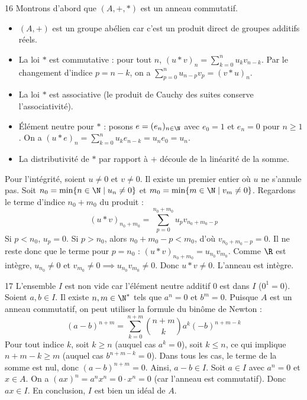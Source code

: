 \begin{correction}{16}
Montrons d'abord que $(A,+,*)$ est un anneau commutatif. 
\begin{itemize}
 \item $(A,+)$ est un groupe abélien car c'est un produit direct de groupes additifs réels. 
 \item La loi $*$ est commutative : pour tout $n$, $(u*v)_n = \sum_{k=0}^n u_k v_{n-k}$. Par le changement d'indice $p = n-k$, on a $\sum_{p=0}^n u_{n-p} v_p = (v*u)_n$. 
 \item La loi $*$ est associative (le produit de Cauchy des suites conserve l'associativité). 
 \item Élément neutre pour $*$ : posons $e = (e_n)_{n\in\N}$ avec $e_0=1$ et $e_n=0$ pour $n \ge 1$. On a $(u*e)_n = \sum_{k=0}^n u_k e_{n-k} = u_n e_0 = u_n$. 
 \item La distributivité de $*$ par rapport à $+$ découle de la linéarité de la somme. 
\end{itemize}
Pour l'intégrité, soient $u \neq 0$ et $v \neq 0$. Il existe un premier entier où $u$ ne s'annule pas. Soit $n_0 = \min \{n \in \N \mid u_n \neq 0\}$ et $m_0 = \min \{m \in \N \mid v_m \neq 0\}$. 
Regardons le terme d'indice $n_0+m_0$ du produit :
\[(u*v)_{n_0+m_0} = \sum_{p=0}^{n_0+m_0} u_p v_{n_0+m_0-p}\]
Si $p < n_0$, $u_p = 0$. Si $p > n_0$, alors $n_0+m_0-p < m_0$, d'où $v_{n_0+m_0-p} = 0$. 
Il ne reste donc que le terme pour $p=n_0$ : $(u*v)_{n_0+m_0} = u_{n_0} v_{m_0}$. 
Comme $\R$ est intègre, $u_{n_0} \neq 0$ et $v_{m_0} \neq 0 \implies u_{n_0} v_{m_0} \neq 0$. Donc $u*v \neq 0$. L'anneau est intègre. 
\end{correction}

\begin{correction}{17}
L'ensemble $I$ est non vide car l'élément neutre additif $0$ est dans $I$ ($0^1=0$). 
Soient $a, b \in I$. Il existe $n, m \in \N^*$ tels que $a^n = 0$ et $b^m = 0$. 
Puisque $A$ est un anneau commutatif, on peut utiliser la formule du binôme de Newton :
\[(a-b)^{n+m} = \sum_{k=0}^{n+m} \binom{n+m}{k} a^k (-b)^{n+m-k}\] 
Pour tout indice $k$, soit $k \ge n$ (auquel cas $a^k = 0$), soit $k \le n$, ce qui implique $n+m-k \ge m$ (auquel cas $b^{n+m-k} = 0$). 
Dans tous les cas, le terme de la somme est nul, donc $(a-b)^{n+m} = 0$. Ainsi, $a-b \in I$. 
Soit $a \in I$ avec $a^n=0$ et $x \in A$. On a $(ax)^n = a^n x^n = 0 \cdot x^n = 0$ (car l'anneau est commutatif). Donc $ax \in I$. 
En conclusion, $I$ est bien un idéal de $A$. 
\end{correction}

